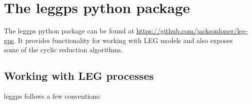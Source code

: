 \documentclass{article}
\theoremstyle{definition}
\begin{document}
                                                                              

\section{The leggps python package}

The leggps python package can be found at \url{https://github.com/jacksonloper/leg-gps}.  It provides functionality for working with LEG models and also exposes some of the cyclic reduction algorithms.  

\subsection{Working with LEG processes}

leggps follows a few conventions:
\end{document}
